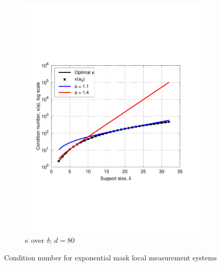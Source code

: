 \begin{figure}
\begin{subfigure}[b]{.49\textwidth}
    \includegraphics[width=\textwidth,trim={.2in 2.5in 1in 2.5in}]{figs/expchart80}
    \caption{$\kappa$ over $\delta$; $d = 80$}
    \label{fig:expchart}
  \end{subfigure}        
  \caption{Condition number for exponential mask local measurement systems}
  \label{fig:exp_kappa}
\end{figure}

